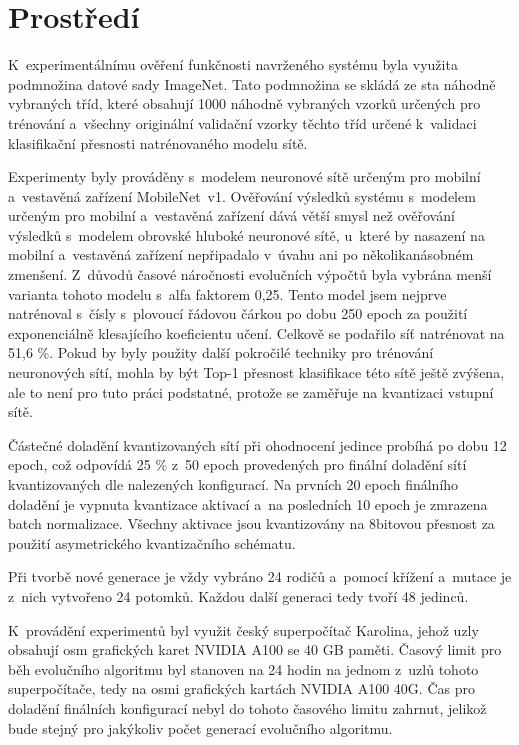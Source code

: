 \section{Prostředí}

K~experimentálnímu ověření funkčnosti navrženého systému byla využita podmnožina datové sady ImageNet. Tato podmnožina se skládá ze sta náhodně vybraných tříd, které obsahují 1000 náhodně vybraných vzorků určených pro trénování a~všechny originální validační vzorky těchto tříd určené k~validaci klasifikační přesnosti natrénovaného modelu sítě.

Experimenty byly prováděny s~modelem neuronové sítě určeným pro mobilní a~vestavěná zařízení MobileNet~v1. Ověřování výsledků systému s~modelem určeným pro mobilní a~vestavěná zařízení dává větší smysl než ověřování výsledků s~modelem obrovské hluboké neuronové sítě, u~které by nasazení na mobilní a~vestavěná zařízení nepřipadalo v~úvahu ani po několikanásobném zmenšení. Z~důvodů časové náročnosti evolučních výpočtů byla vybrána menší varianta tohoto modelu s~alfa faktorem 0,25. Tento model jsem nejprve natrénoval s~čísly s~plovoucí řádovou čárkou po dobu 250 epoch za použití exponenciálně klesajícího koeficientu učení. Celkově se podařilo síť natrénovat na 51,6 \%. Pokud by byly použity další pokročilé techniky pro trénování neuronových sítí, mohla by být Top-1 přesnost klasifikace této sítě ještě zvýšena, ale to není pro tuto práci podstatné, protože se zaměřuje na kvantizaci vstupní sítě.

Částečné doladění kvantizovaných sítí při ohodnocení jedince probíhá po dobu 12 epoch, což odpovídá 25 \% z~50 epoch provedených pro finální doladění sítí kvantizovaných dle nalezených konfigurací. Na prvních 20 epoch finálního doladění je vypnuta kvantizace aktivací a~na posledních 10 epoch je zmrazena batch normalizace. Všechny aktivace jsou kvantizovány na 8bitovou přesnost za použití asymetrického kvantizačního schématu. 

Při tvorbě nové generace je vždy vybráno 24 rodičů a~pomocí křížení a~mutace je z~nich vytvořeno 24 potomků. Každou další generaci tedy tvoří 48 jedinců.

K~provádění experimentů byl využit český superpočítač Karolina, jehož uzly obsahují osm grafických karet NVIDIA A100 se 40 GB paměti. Časový limit pro běh evolučního algoritmu byl stanoven na 24 hodin na jednom z~uzlů tohoto superpočítače, tedy na osmi grafických kartách NVIDIA A100 40G. Čas pro doladění finálních konfigurací nebyl do tohoto časového limitu zahrnut, jelikož bude stejný pro jakýkoliv počet generací evolučního algoritmu.

